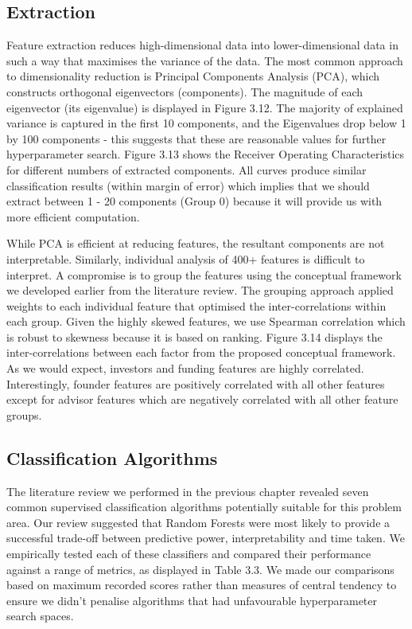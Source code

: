 \documentclass[../thesis/thesis.tex]{subfiles}
\begin{document}
\begin{enumerate}
\subsection{Extraction}

Feature extraction reduces high-dimensional data into lower-dimensional data in such a way that maximises the variance of the data. The most common approach to dimensionality reduction is Principal Components Analysis (PCA), which constructs orthogonal eigenvectors (components). The magnitude of each eigenvector (its eigenvalue) is displayed in Figure 3.12. The majority of explained variance is captured in the first 10 components, and the Eigenvalues drop below 1 by 100 components - this suggests that these are reasonable values for further hyperparameter search. Figure 3.13 shows the Receiver Operating Characteristics for different numbers of extracted components. All curves produce similar classification results (within margin of error) which implies that we should extract between 1 - 20 components (Group 0) because it will provide us with more efficient computation.

While PCA is efficient at reducing features, the resultant components are not interpretable. Similarly, individual analysis of 400+ features is difficult to interpret. A compromise is to group the features using the conceptual framework we developed earlier from the literature review. The grouping approach applied weights to each individual feature that optimised the inter-correlations within each group. Given the highly skewed features, we use Spearman correlation which is robust to skewness because it is based on ranking. Figure 3.14 displays the inter-correlations between each factor from the proposed conceptual framework. As we would expect, investors and funding features are highly correlated. Interestingly, founder features are positively correlated with all other features except for advisor features which are negatively correlated with all other feature groups.

\subsection{Classification Algorithms}

The literature review we performed in the previous chapter revealed seven common supervised classification algorithms potentially suitable for this problem area. Our review suggested that Random Forests were most likely to provide a successful trade-off between predictive power, interpretability and time taken. We empirically tested each of these classifiers and compared their performance against a range of metrics, as displayed in Table 3.3. We made our comparisons based on maximum recorded scores rather than measures of central tendency to ensure we didn’t penalise algorithms that had unfavourable hyperparameter search spaces.


\end{enumerate}
\end{document}
